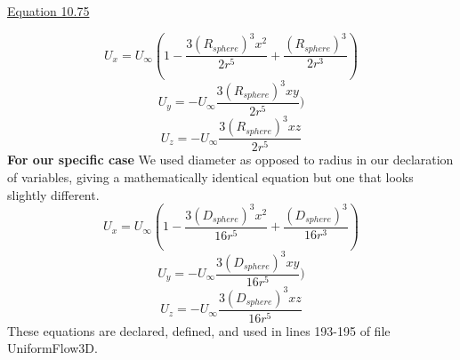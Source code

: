 \documentclass{article}
\begin{document}
\begin{center}
\begin{Large}
\begin{small}\href{https://web.stanford.edu/~cantwell/AA200_Course_Material/AA200_Lectures/AA200_Ch_10_Elements_of_potential_flow_Vortex_Sticks_and_Stokes_Flow_Brian_Cantwell.pdf}{Equation 10.75}\end{small}
\[
U_x = U_\infty (1-\frac{3(R_{sphere})^3x^2}{2r^5} + \frac{(R_{sphere})^3}{2r^3} )
\]
\[
U_y = -U_\infty \frac{3(R_{sphere})^3xy}{2r^5} )
\]
\[
U_z = -U_\infty \frac{3(R_{sphere})^3xz}{2r^5} 
\]
\bigbreak
\textbf{For our specific case}
\bigbreak
We used diameter as opposed to radius in our declaration of variables, giving a mathematically identical equation but one that looks slightly different.
\bigbreak
\[
U_x = U_\infty (1-\frac{3(D_{sphere})^3x^2}{16r^5} + \frac{(D_{sphere})^3}{16r^3} )
\]
\[
U_y = -U_\infty \frac{3(D_{sphere})^3xy}{16r^5} )
\]
\[
U_z = -U_\infty \frac{3(D_{sphere})^3xz}{16r^5}
\]
\bigbreak
These equations are declared, defined, and used in lines 193-195 of
file UniformFlow3D.

\end{Large}
\end{center}
\end{document}
